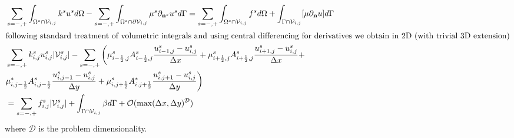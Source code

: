 \documentclass{elsarticle}
\begin{document}
\begin{align*}
	 & \sum_{s=-,+}\int_{\Omega^s \cap \mathcal{V}_{i,j}}  k^{s} u^{s} d\Omega -\sum_{s=-,+} \int_{\Omega^s\cap \partial\mathcal{V}_{i,j}} \mu^{s}\partial_{\mathbf{n}^s} u^s  d\Gamma = \sum_{s=-,+}\int_{\Omega^s \cap \mathcal{V}_{i,j}}  f^{s} d\Omega + \int_{\Gamma \cap \mathcal{V}_{i,j}}[\mu\partial_{\mathbf{n}}u]d\Gamma \\
	\intertext{following standard treatment of volumetric integrals and using central differencing for derivatives we obtain in 2D (with trivial 3D extension)}
	 & \sum_{s=-,+} k_{i,j}^s u_{i,j}^{s} |\mathcal{V}_{i,j}^s| - \sum_{s=-,+}\bigg( \mu_{i-\frac{1}{2},j}^s A_{i-\frac{1}{2},j}^s\frac{u_{i-1,j}^s - u_{i,j}^s}{\Delta x}     +   \mu_{i+\frac{1}{2},j}^s A_{i+\frac{1}{2},j}^s\frac{u_{i+1,j}^s - u_{i,j}^s}{\Delta x} +                                                          \\
	 & \mu_{i, j-\frac{1}{2}}^s A_{i, j-\frac{1}{2}}^s\frac{u_{i,j-1}^s - u_{i,j}^s}{\Delta y} + \mu_{i, j+\frac{1}{2}}^s A_{i, j+\frac{1}{2}}^s\frac{u_{i,j+1}^s - u_{i,j}^s}{\Delta y} \bigg)                                                                                                                                     \\
	 & =  \sum_{s=-,+} f_{i,j}^{s} |\mathcal{V}_{i,j}^s| + \int_{\Gamma\cap \mathcal{V}_{i,j}} \beta d\Gamma + \mathcal{O}(\max(\Delta x, \Delta y)^\mathcal{D})
\end{align*}
where $\mathcal{D}$ is the problem dimensionality.
\end{document}
